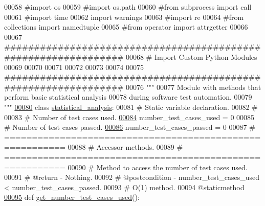 \begin{DoxyCode}
00058 \textcolor{comment}{#import os}
00059 \textcolor{comment}{#import os.path}
00060 \textcolor{comment}{#from subprocess import call}
00061 \textcolor{comment}{#import time}
00062 \textcolor{keyword}{import} warnings
00063 \textcolor{comment}{#import re}
00064 \textcolor{comment}{#from collections import namedtuple}
00065 \textcolor{comment}{#from operator import attrgetter}
00066 
00067 \textcolor{comment}{###############################################################}
00068 \textcolor{comment}{#   Import Custom Python Modules}
00069 
00070 
00071 
00072 
00073 
00074 
00075 \textcolor{comment}{###############################################################}
00076 \textcolor{stringliteral}{"""}
00077 \textcolor{stringliteral}{    Module with methods that perform basic statistical analysis}
00078 \textcolor{stringliteral}{        during software test automation.}
00079 \textcolor{stringliteral}{"""}
\hypertarget{test__statistics_8py_source_l00080}{}\hyperlink{classstatistics_1_1test__statistics_1_1statistical__analysis}{00080} \textcolor{keyword}{class }\hyperlink{classstatistics_1_1test__statistics_1_1statistical__analysis}{statistical\_analysis}:
00081     \textcolor{comment}{#   Static variable declaration.}
00082     \textcolor{comment}{#}
00083     \textcolor{comment}{#   Number of test cases used.}
\hypertarget{test__statistics_8py_source_l00084}{}\hyperlink{classstatistics_1_1test__statistics_1_1statistical__analysis_afed7a27a010e7377d2719b315d5d5f17}{00084}     number\_test\_cases\_used = 0
00085     \textcolor{comment}{#   Number of test cases passed.}
\hypertarget{test__statistics_8py_source_l00086}{}\hyperlink{classstatistics_1_1test__statistics_1_1statistical__analysis_ac7555db570919cec38a8325d8427093e}{00086}     number\_test\_cases\_passed = 0
00087     \textcolor{comment}{# =========================================================}
00088     \textcolor{comment}{#   Accessor methods.}
00089     \textcolor{comment}{# =========================================================}
00090     \textcolor{comment}{#   Method to access the number of test cases used.}
00091     \textcolor{comment}{#   @return - Nothing.}
00092     \textcolor{comment}{#   @postcondition - number\_test\_cases\_used < number\_test\_cases\_passed.}
00093     \textcolor{comment}{#   O(1) method.}
00094     @staticmethod
\hypertarget{test__statistics_8py_source_l00095}{}\hyperlink{classstatistics_1_1test__statistics_1_1statistical__analysis_a8bddd92400d64e68caf934defa5ededb}{00095}     \textcolor{keyword}{def }\hyperlink{classstatistics_1_1test__statistics_1_1statistical__analysis_a8bddd92400d64e68caf934defa5ededb}{get\_number\_test\_cases\_used}():

\end{DoxyCode}
